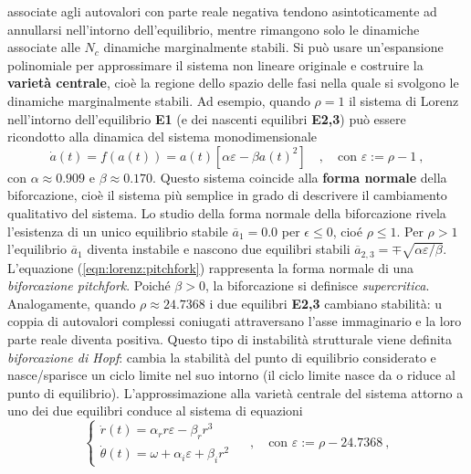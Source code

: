  associate agli autovalori con parte reale negativa tendono asintoticamente ad annullarsi
 nell'intorno dell'equilibrio, mentre rimangono solo le dinamiche associate alle $N_c$ 
 dinamiche marginalmente stabili.
\newline
Si può usare un'espansione polinomiale per approssimare il sistema non lineare originale e
 costruire la \textbf{varietà centrale}, cioè la regione dello spazio delle fasi nella quale
 si svolgono le dinamiche marginalmente stabili.
\newline
\noindent 
Ad esempio, quando $\rho = 1$ il sistema di Lorenz nell'intorno dell'equilibrio \textbf{E1} (e
 dei nascenti equilibri \textbf{E2,3}) può essere ricondotto alla dinamica del sistema monodimensionale
\begin{equation}\label{eqn:lorenz:pitchfork}
 \dot{a}(t) = f(a(t)) = a(t) [ \alpha \varepsilon - \beta a(t)^2 ] \quad , \quad
 \text{con } \varepsilon := \rho-1 \ ,
\end{equation}
con $\alpha \approx 0.909$ e $\beta \approx 0.170$. Questo sistema coincide alla \textbf{forma
 normale} della biforcazione, cioè il sistema più semplice in grado di descrivere il cambiamento
 qualitativo del sistema. Lo studio della forma normale della biforcazione rivela l'esistenza
 di un unico equilibrio stabile $\overline{a}_1 = 0.0$ per $\epsilon \leq 0$, cioé $\rho \leq 1$.
 Per $\rho > 1$ l'equilibrio $\overline{a}_1$ diventa instabile e nascono due equilibri stabili
 $\overline{a}_{2,3} = \mp \sqrt{\alpha \varepsilon / \beta}$.
L'equazione (\ref{eqn:lorenz:pitchfork}) rappresenta la forma normale di una \textit{biforcazione
 pitchfork}. Poiché $\beta > 0$, la biforcazione si definisce \textit{supercritica}.
\newline
Analogamente, quando $\rho \approx 24.7368$ i due equilibri \textbf{E2,3} cambiano stabilità: u
 coppia di autovalori complessi coniugati attraversano l'asse immaginario e la loro parte
 reale diventa positiva. Questo tipo di instabilità strutturale viene definita
 \textit{biforcazione di Hopf}: cambia la stabilità del punto di equilibrio considerato 
 e nasce/sparisce un ciclo limite nel suo intorno (il ciclo limite nasce da o riduce al
 punto di equilibrio).
L'approssimazione alla varietà centrale del sistema attorno a uno dei due equilibri conduce 
 al sistema di equazioni
\begin{equation}\label{eqn:lorenz:hopf}
\begin{cases}
 \dot{r}(t) = \alpha_r r \varepsilon - \beta_r r^3 \\
 \dot{\theta}(t) = \omega + \alpha_i \varepsilon + \beta_i r^2 \ 
\end{cases} \quad , \quad 
 \text{con } \varepsilon := \rho-24.7368 \ ,
\end{equation}

